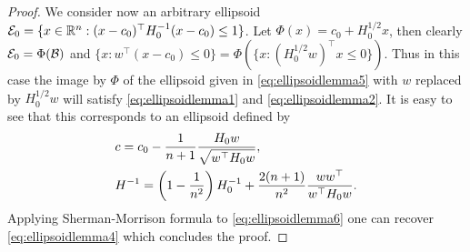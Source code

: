 \begin{proof}
We consider now an arbitrary ellipsoid $\mathcal{E}_0 = \{x \in \mathbb{R}^n : (x - c_0)^{\top} H_0^{-1} (x-c_0) \leq 1 \}$. Let $\Phi(x) = c_0 + H_0^{1/2} x$, then clearly $\mathcal{E}_0 = \Phi(\mathcal{B})$ and $\{x : w^{\top}(x - c_0) \leq 0\} = \Phi(\{x : (H_0^{1/2} w)^{\top} x \leq 0\})$. Thus in this case the image by $\Phi$ of the ellipsoid given in \eqref{eq:ellipsoidlemma5} with $w$ replaced by $H_0^{1/2} w$ will satisfy \eqref{eq:ellipsoidlemma1} and \eqref{eq:ellipsoidlemma2}. It is easy to see that this corresponds to an ellipsoid defined by
\begin{align}
& c = c_0 - \frac{1}{n+1} \frac{H_0 w}{\sqrt{w^{\top} H_0 w}} , \notag \\
& H^{-1} = \left(1 - \frac{1}{n^2}\right) H_0^{-1} + \frac{2(n+1)}{n^2} \frac{w w^{\top}}{w^{\top} H_0 w} . \label{eq:ellipsoidlemma6}
\end{align}
Applying Sherman-Morrison formula to \eqref{eq:ellipsoidlemma6} one can recover \eqref{eq:ellipsoidlemma4} which concludes the proof.
\end{proof}

